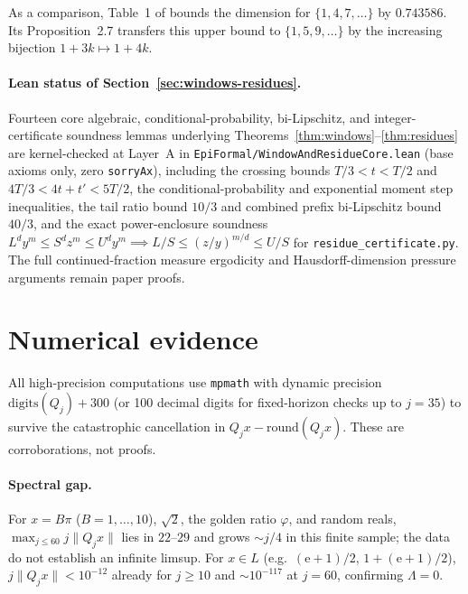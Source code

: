 \documentclass[11pt]{article}
\theoremstyle{definition}
\theoremstyle{remark}
\newcommand{\ee}{\mathrm{e}}
\newcommand{\Lam}{\Lambda}
\begin{document}
As a comparison, Table~1 of \cite{CLU} bounds the dimension for
$\{1,4,7,\ldots\}$ by $0.743586$. Its Proposition~2.7 transfers this upper bound
to $\{1,5,9,\ldots\}$ by the increasing bijection $1+3k\mapsto 1+4k$.

\paragraph{Lean status of Section~\ref{sec:windows-residues}.}
Fourteen core algebraic, conditional-probability, bi-Lipschitz, and
integer-certificate soundness lemmas underlying
Theorems~\ref{thm:windows}--\ref{thm:residues} are kernel-checked at Layer~A in
\texttt{EpiFormal/\allowbreak{}Window\allowbreak{}And\allowbreak{}Residue\allowbreak{}Core.lean}
(base axioms only, zero \texttt{sorryAx}), including the crossing bounds
$T/3<t<T/2$ and $4T/3<4t+t'<5T/2$, the conditional-probability and exponential
moment step inequalities, the tail ratio bound $10/3$ and combined prefix
bi-Lipschitz bound $40/3$, and the exact power-enclosure soundness
$L^d y^m\le S^d z^m\le U^d y^m\implies L/S\le(z/y)^{m/d}\le U/S$ for
\texttt{residue\_certificate.py}. The full continued-fraction measure
ergodicity and Hausdorff-dimension pressure arguments remain paper proofs.

\section{Numerical evidence}\label{sec:num}

All high-precision computations use \texttt{mpmath} with dynamic precision
$\mathrm{digits}(Q_j)+300$ (or 100 decimal digits for fixed-horizon checks up
to $j=35$) to survive the catastrophic cancellation in
$Q_jx-\mathrm{round}(Q_jx)$. These are corroborations, not proofs.

\paragraph{Spectral gap.} For $x=B\pi$ ($B=1,\dots,10$), $\sqrt2$, the golden
ratio $\varphi$, and random reals, $\max_{j\le60}j\|Q_jx\|$ lies in $22$--$29$
and grows $\sim j/4$ in this finite sample; the data do not establish an
infinite limsup. For $x\in L$ (e.g.\ $(\ee+1)/2$, $1+(\ee+1)/2$),
$j\|Q_jx\|<10^{-12}$ already for $j\ge10$ and $\sim10^{-117}$ at $j=60$,
confirming $\Lam=0$.
\end{document}
